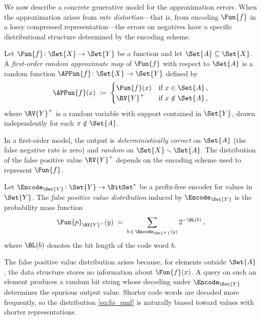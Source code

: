\documentclass[ ../main.tex]{subfiles}
\begin{document}
We now describe a concrete generative model for the approximation errors.
When the approximation arises from \emph{rate distortion}---that is, from
encoding $\Fun{f}$ in a lossy compressed representation---the errors on
negatives have a specific distributional structure determined by the encoding
scheme.

\begin{definition}
\label{def:first_order_map}
Let $\Fun{f} \colon \Set{X} \to \Set{Y}$ be a function and let
$\Set{A} \subseteq \Set{X}$.
A \emph{first-order random approximate map} of $\Fun{f}$ with respect to
$\Set{A}$ is a random function
$\APFun{f} \colon \Set{X} \to \Set{Y}$ defined by
\begin{equation}
\label{eq:first_order_def}
    \APFun{f}(x) \;\coloneqq\;
    \begin{cases}
        \Fun{f}(x)     & \text{if } x \in \Set{A}\,,\\
        \RV{Y}^{+}     & \text{if } x \notin \Set{A}\,,
    \end{cases}
\end{equation}
where $\RV{Y}^{+}$ is a random variable with support contained in $\Set{Y}$,
drawn independently for each $x \notin \Set{A}$.
\end{definition}

In a first-order model, the output is \emph{deterministically correct} on
$\Set{A}$ (the false negative rate is zero) and \emph{random} on
$\Set{X} \smallsetminus \Set{A}$.
The distribution of the false positive value $\RV{Y}^{+}$ depends on the
encoding scheme used to represent $\Fun{f}$.

\begin{definition}
\label{def:fp_distribution}
Let $\Encode_{\Set{Y}} \colon \Set{Y} \to \BitSet^{*}$ be a prefix-free
encoder for values in $\Set{Y}$.
The \emph{false positive value distribution} induced by $\Encode_{\Set{Y}}$ is
the probability mass function
\begin{equation}
\label{eq:fp_pmf}
    \Fun{p}_{\RV{Y}^{+}}(y)
    \;=\;
    \sum_{b \,\in\, \Encode_{\Set{Y}}(y)} 2^{-\BL(b)}\,,
\end{equation}
where $\BL(b)$ denotes the bit length of the code word $b$.
\end{definition}

The false positive value distribution arises because, for elements outside
$\Set{A}$, the data structure stores no information about $\Fun{f}(x)$.
A query on such an element produces a random bit string whose decoding under
$\Encode_{\Set{Y}}$ determines the spurious output value.
Shorter code words are decoded more frequently, so the distribution
\eqref{eq:fp_pmf} is naturally biased toward values with shorter
representations.
\end{document}
